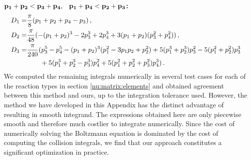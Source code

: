 ${\bf p_1+p_2<p_3+p_4\text{, \hspace{1mm} }p_1+p_4<p_2+p_3}${\bf :}
\begin{align}
D_1=&\frac{\pi}{8}(p_1+p_2+p_4-p_3)\,,\\
D_2=&\frac{\pi}{48}(-(p_1+p_2)^3-2p_3^3+2p_4^3+3(p_1+p_2)(p_3^2+p_4^2))\,,\notag\\
D_3=&\frac{\pi}{240}(p_3^5-p_4^5-(p_1+p_2)^3(p_1^2-3p_1p_2+p_2^2)+5(p_1^3+p_2^3)p_3^2-5(p_1^2+p_2^2)p_3^3\notag\\
&\hspace{7mm}+5(p_1^3+p_2^3-p_3^3)p_4^2+5(p_1^2+p_2^2+p_3^2)p_4^3)\,.\notag
\end{align}
We computed the remaining integrals numerically in several test cases for each of the reaction types in section \ref{nu:matrix:elements} and obtained agreement between this method and ours, up to the integration tolerance used.  However, the method we have developed in this Appendix has the distinct advantage of resulting in  smooth integrand.  The expressions obtained here are only piecewise smooth and therefore much costlier to integrate numerically.  Since the cost of numerically solving the Boltzmann equation is dominated by the cost of computing the collision integrals, we find that our approach constitutes a  significant optimization in practice.



